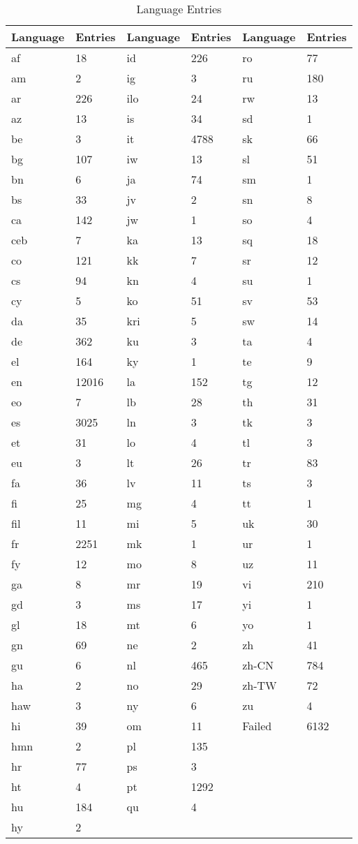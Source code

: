 \begin{table}[!htbp]
\centering
\begin{tabular}{llllll}
\textbf{Language} & \textbf{Entries} & \textbf{Language} & \textbf{Entries} & \textbf{Language} & \textbf{Entries} \\
\hline
af & 18 & id & 226 & ro & 77 \\
am & 2 & ig & 3 & ru & 180 \\
ar & 226 & ilo & 24 & rw & 13 \\
az & 13 & is & 34 & sd & 1 \\
be & 3 & it & 4788 & sk & 66 \\
bg & 107 & iw & 13 & sl & 51 \\
bn & 6 & ja & 74 & sm & 1 \\
bs & 33 & jv & 2 & sn & 8 \\
ca & 142 & jw & 1 & so & 4 \\
ceb & 7 & ka & 13 & sq & 18 \\
co & 121 & kk & 7 & sr & 12 \\
cs & 94 & kn & 4 & su & 1 \\
cy & 5 & ko & 51 & sv & 53 \\
da & 35 & kri & 5 & sw & 14 \\
de & 362 & ku & 3 & ta & 4 \\
el & 164 & ky & 1 & te & 9 \\
en & 12016 & la & 152 & tg & 12 \\
eo & 7 & lb & 28 & th & 31 \\
es & 3025 & ln & 3 & tk & 3 \\
et & 31 & lo & 4 & tl & 3 \\
eu & 3 & lt & 26 & tr & 83 \\
fa & 36 & lv & 11 & ts & 3 \\
fi & 25 & mg & 4 & tt & 1 \\
fil & 11 & mi & 5 & uk & 30 \\
fr & 2251 & mk & 1 & ur & 1 \\
fy & 12 & mo & 8 & uz & 11 \\
ga & 8 & mr & 19 & vi & 210 \\
gd & 3 & ms & 17 & yi & 1 \\
gl & 18 & mt & 6 & yo & 1 \\
gn & 69 & ne & 2 & zh & 41 \\
gu & 6 & nl & 465 & zh-CN & 784 \\
ha & 2 & no & 29 & zh-TW & 72 \\
haw & 3 & ny & 6 & zu & 4 \\
hi & 39 & om & 11 & Failed & 6132 \\
hmn & 2 & pl & 135 & \ & \ \\
hr & 77 & ps & 3 & \ & \ \\
ht & 4 & pt & 1292 & \ & \ \\
hu & 184 & qu & 4 & \ & \ \\
hy & 2 & \ & \ & \ & \ \\
\end{tabular}
\caption{Language Entries}
\label{appendix01:tab:language_distribution}
\end{table}


\clearpage